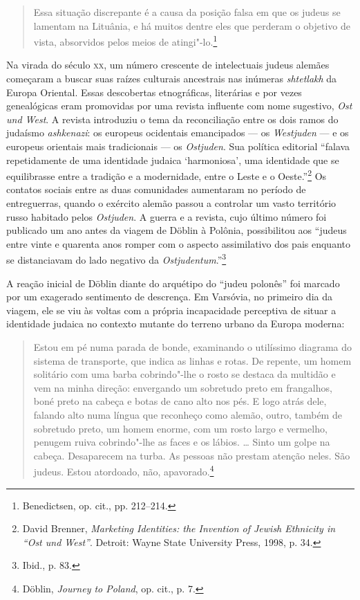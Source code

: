 \begin{quote}
Essa situação discrepante é a causa da posição falsa em que os judeus se
lamentam na Lituânia, e há muitos dentre eles que perderam o objetivo de
vista, absorvidos pelos meios de atingi"-lo.\footnote{Benedictsen, op. cit., pp. 212--214.} 
\end{quote}

Na virada do século \textsc{xx}, um número crescente de intelectuais judeus
alemães começaram a buscar suas raízes culturais ancestrais nas inúmeras
\textit{shtetlakh} da Europa Oriental. Essas descobertas etnográficas,
literárias e por vezes genealógicas eram promovidas por uma revista
influente com nome sugestivo, \textit{Ost und West}. A revista introduziu
o tema da reconciliação entre os dois ramos do judaísmo \textit{ashkenazi}: os
europeus ocidentais emancipados --- os \textit{Westjuden} --- e os europeus
orientais mais tradicionais --- os \textit{Ostjuden}. Sua política editorial
``falava repetidamente de uma identidade judaica `harmoniosa', uma
identidade que se equilibrasse entre a tradição e a modernidade, entre o
Leste e o Oeste.''\footnote{David Brenner, \textit{Marketing Identities: the Invention of Jewish Ethnicity in ``Ost und West''}. Detroit: Wayne State University Press, 1998, p. 34.} Os contatos sociais entre as duas comunidades aumentaram no período de entreguerras, quando o
exército alemão passou a controlar um vasto território russo habitado
pelos \textit{Ostjuden}. A guerra e a revista, cujo último número foi
publicado um ano antes da viagem de Döblin à Polônia, possibilitou aos
``judeus entre vinte e quarenta anos romper com o aspecto assimilativo
dos pais enquanto se distanciavam do lado negativo da
\textit{Ostjudentum}.''\footnote{Ibid., p. 83.}

A reação inicial de Döblin diante do arquétipo do ``judeu polonês'' foi
marcado por um exagerado sentimento de descrença. Em Varsóvia, no
primeiro dia da viagem, ele se viu às voltas com a própria incapacidade
perceptiva de situar a identidade judaica no contexto mutante do terreno
urbano da Europa moderna:

\begin{quote}
Estou em pé numa parada de bonde, examinando o utilíssimo diagrama do
sistema de transporte, que indica as linhas e rotas. De repente, um
homem solitário com uma barba cobrindo"-lhe o rosto se destaca da
multidão e vem na minha direção: envergando um sobretudo preto em
frangalhos, boné preto na cabeça e botas de cano alto nos pés. E logo
atrás dele, falando alto numa língua que reconheço como alemão, outro,
também de sobretudo preto, um homem enorme, com um rosto largo e
vermelho, penugem ruiva cobrindo"-lhe as faces e os lábios. \ldots{}
Sinto um golpe na cabeça. Desaparecem na turba. As pessoas não prestam
atenção neles. São judeus. Estou atordoado, não, apavorado.\footnote{Döblin, \textit{Journey to Poland}, op. cit., p. 7.} 
\end{quote}

